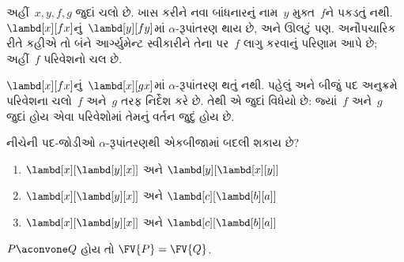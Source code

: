 \documentclass[../../../include/open-logic-section]{subfiles}
\begin{document}
\begin{ex}
  અહીં~$x,y,f,g$ જુદાં ચલો છે. ખાસ કરીને નવા બાંધનારનું
  નામ~$y$ મુક્ત~$f$ને પકડતું નથી.
  $\lambd[x][f x]$નું~$\lambd[y][f
  y]$માં $\alpha$-રૂપાંતરણ થાય છે, અને ઊલટું પણ.
  અનૌપચારિક રીતે કહીએ તો બંને આર્ગ્યુમેન્ટ સ્વીકારીને તેના
  પર~$f$ લાગુ કરવાનું પરિણામ આપે છે; અહીં~$f$ પરિવેશનો
  ચલ છે.

  $\lambd[x][f x]$નું~$\lambd[x][g
    x]$માં $\alpha$-રૂપાંતરણ થતું નથી. પહેલું અને બીજું પદ
  અનુક્રમે પરિવેશના ચલો~$f$ અને~$g$ તરફ નિર્દેશ કરે છે.
  તેથી એ જુદાં વિધેયો છે: જ્યાં~$f$ અને~$g$ જુદાં હોય એવા
  પરિવેશોમાં તેમનું વર્તન જુદું હોય છે.
\end{ex}

\begin{prob}
  નીચેની પદ-જોડીઓ $\alpha$-રૂપાંતરણથી એકબીજામાં બદલી શકાય છે?
  \begin{enumerate}
  \item $\lambd[x][\lambd[y][x]]$ અને $\lambd[y][\lambd[x][y]]$
  \item $\lambd[x][\lambd[y][x]]$ અને $\lambd[c][\lambd[b][a]]$
  \item $\lambd[x][\lambd[y][x]]$ અને $\lambd[c][\lambd[b][a]]$
  \end{enumerate}
\end{prob}

\begin{lem}
  $P \aconvone Q$ હોય તો $\FV{P} = \FV{Q}$.
\end{lem}
\end{document}
